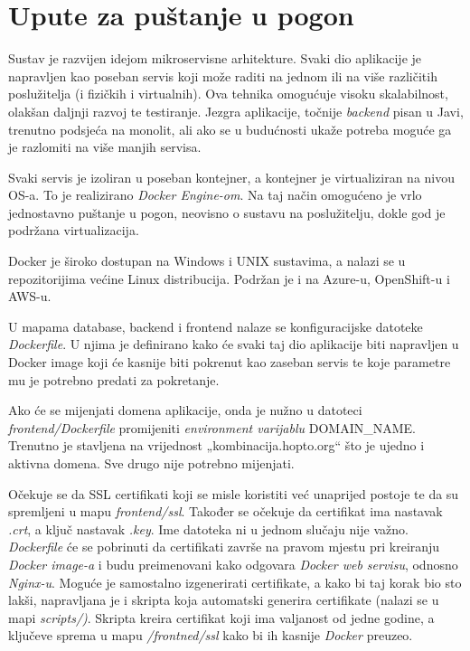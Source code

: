 		\section{Upute za puštanje u pogon}
		
	
		
		Sustav je razvijen idejom mikroservisne arhitekture. Svaki dio aplikacije je napravljen kao poseban servis koji može raditi na jednom ili na više različitih poslužitelja (i fizičkih i virtualnih). Ova tehnika omogućuje visoku skalabilnost, olakšan daljnji razvoj te testiranje. Jezgra aplikacije, točnije  \textit{backend} pisan u Javi, trenutno podsjeća na monolit, ali ako se u budućnosti ukaže potreba moguće ga je razlomiti na više manjih servisa. 

		Svaki servis je izoliran u poseban kontejner, a kontejner je virtualiziran na nivou OS-a. To je realizirano  \textit{Docker Engine-om}. Na taj način omogućeno je vrlo jednostavno puštanje u pogon, neovisno o sustavu na poslužitelju, dokle god je podržana virtualizacija. 

		Docker je široko dostupan na Windows i UNIX sustavima, a nalazi se u repozitorijima većine Linux distribucija. Podržan je i na Azure-u, OpenShift-u i AWS-u.\\
		
		
		
	
		U mapama database, backend i frontend nalaze se konfiguracijske datoteke  \textit{Dockerfile}. U njima je definirano kako će svaki taj dio aplikacije biti napravljen u Docker image koji će kasnije biti pokrenut kao zaseban servis te koje parametre mu je potrebno predati za pokretanje. 
			
			Ako će se mijenjati domena aplikacije, onda je nužno u datoteci  \textit{frontend/Dockerfile} promijeniti  \textit{environment varijablu} DOMAIN\_NAME. Trenutno je stavljena na vrijednost „kombinacija.hopto.org“ što je ujedno i aktivna domena. Sve drugo nije potrebno mijenjati.
			
			
Očekuje se da SSL certifikati koji se misle koristiti već unaprijed postoje te da su spremljeni u mapu \textit{frontend/ssl}. Također se očekuje da certifikat ima nastavak \textit{.crt}, a ključ nastavak \textit{.key}. Ime datoteka ni u jednom slučaju nije važno. \textit{Dockerfile} će se pobrinuti da certifikati završe na pravom mjestu pri kreiranju \textit{Docker image-a} i budu preimenovani kako odgovara \textit{Docker web servisu}, odnosno \textit{Nginx-u}. Moguće je samostalno izgenerirati certifikate, a kako bi taj korak bio sto lakši, napravljana je i skripta koja automatski generira certifikate (nalazi se u mapi \textit{scripts/)}. Skripta kreira certifikat koji ima valjanost od jedne godine, a ključeve sprema u mapu \textit{/frontned/ssl} kako bi ih kasnije \textit{Docker} preuzeo.
			
